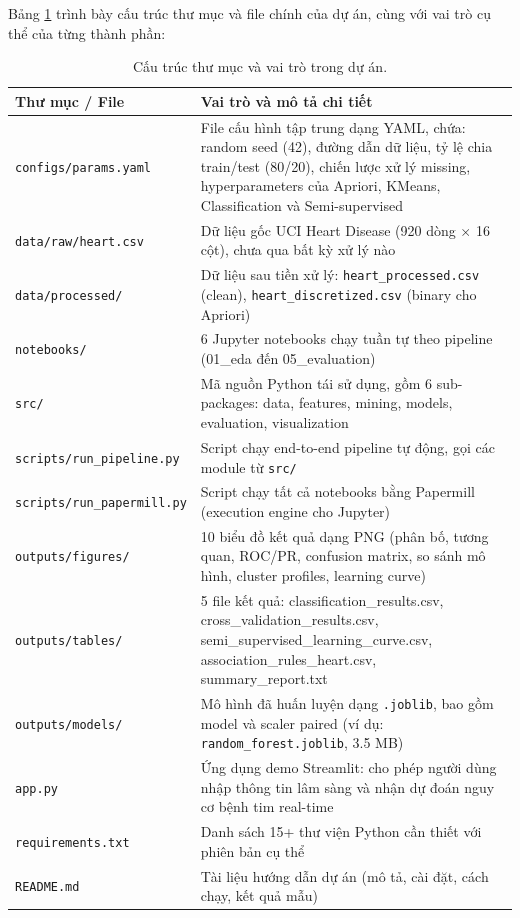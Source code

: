 Bảng \ref{tab:repo_structure} trình bày cấu trúc thư mục và file chính của dự án, cùng với vai trò cụ thể của từng thành phần:

\begin{table}[H]
\centering
\caption{Cấu trúc thư mục và vai trò trong dự án.}
\label{tab:repo_structure}
\small
\begin{tabular}{|l|p{9cm}|}
\hline
\textbf{Thư mục / File} & \textbf{Vai trò và mô tả chi tiết} \\ \hline
\texttt{configs/params.yaml} & File cấu hình tập trung dạng YAML, chứa: random seed (42), đường dẫn dữ liệu, tỷ lệ chia train/test (80/20), chiến lược xử lý missing, hyperparameters của Apriori, KMeans, Classification và Semi-supervised \\ \hline
\texttt{data/raw/heart.csv} & Dữ liệu gốc UCI Heart Disease (920 dòng $\times$ 16 cột), chưa qua bất kỳ xử lý nào \\ \hline
\texttt{data/processed/} & Dữ liệu sau tiền xử lý: \texttt{heart\_processed.csv} (clean), \texttt{heart\_discretized.csv} (binary cho Apriori) \\ \hline
\texttt{notebooks/} & 6 Jupyter notebooks chạy tuần tự theo pipeline (01\_eda đến 05\_evaluation) \\ \hline
\texttt{src/} & Mã nguồn Python tái sử dụng, gồm 6 sub-packages: data, features, mining, models, evaluation, visualization \\ \hline
\texttt{scripts/run\_pipeline.py} & Script chạy end-to-end pipeline tự động, gọi các module từ \texttt{src/} \\ \hline
\texttt{scripts/run\_papermill.py} & Script chạy tất cả notebooks bằng Papermill (execution engine cho Jupyter) \\ \hline
\texttt{outputs/figures/} & 10 biểu đồ kết quả dạng PNG (phân bố, tương quan, ROC/PR, confusion matrix, so sánh mô hình, cluster profiles, learning curve) \\ \hline
\texttt{outputs/tables/} & 5 file kết quả: classification\_results.csv, cross\_validation\_results.csv, semi\_supervised\_learning\_curve.csv, association\_rules\_heart.csv, summary\_report.txt \\ \hline
\texttt{outputs/models/} & Mô hình đã huấn luyện dạng \texttt{.joblib}, bao gồm model và scaler paired (ví dụ: \texttt{random\_forest.joblib}, 3.5 MB) \\ \hline
\texttt{app.py} & Ứng dụng demo Streamlit: cho phép người dùng nhập thông tin lâm sàng và nhận dự đoán nguy cơ bệnh tim real-time \\ \hline
\texttt{requirements.txt} & Danh sách 15+ thư viện Python cần thiết với phiên bản cụ thể \\ \hline
\texttt{README.md} & Tài liệu hướng dẫn dự án (mô tả, cài đặt, cách chạy, kết quả mẫu) \\ \hline
\end{tabular}
\end{table}

